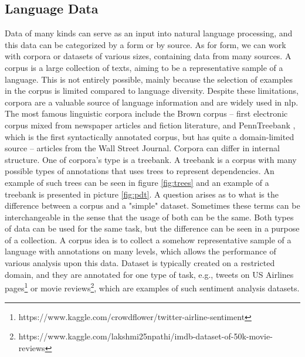 \subsection{Language Data}
Data of many kinds can serve as an input into natural language processing, and this data can be categorized by a form or by source.
As for form, we can work with corpora or datasets of various sizes, containing data from many sources. A corpus is a large collection of texts, aiming to be a representative sample of a language. This is not entirely possible, mainly because the selection of examples in the corpus is limited compared to language diversity. Despite these limitations, corpora are a valuable source of language information and are widely used in \acrshort{nlp}. The most famous linguistic corpora include the Brown corpus \citep{francis79browncorpus} -- first electronic corpus mixed from newspaper articles and fiction literature, and PennTreebank \citep{Marcus1993}, which is the first syntactically annotated corpus, but has quite a domain-limited source -- articles from the Wall Street Journal. Corpora can differ in internal structure. One of corpora's type is a treebank. A treebank is a corpus with many possible types of annotations that uses trees to represent dependencies. An example of such trees can be seen in figure \ref{fig:trees} and an example of a treebank is presented in picture \ref{fig:pdt}.
A question arises as to what is the difference between a corpus and a "simple" dataset. Sometimes these terms can be interchangeable in the sense that the usage of both can be the same. Both types of data can be used for the same task, but the difference can be seen in a purpose of a collection. A corpus idea is to collect a somehow representative sample of a language with annotations on many levels, which allows the performance of various analysis upon this data. Dataset is typically created on a restricted domain, and they are annotated for one type of task, e.g., tweets on US Airlines pages\footnote{https://www.kaggle.com/crowdflower/twitter-airline-sentiment} or movie reviews\footnote{https://www.kaggle.com/lakshmi25npathi/imdb-dataset-of-50k-movie-reviews}, which are examples of such sentiment analysis datasets.
